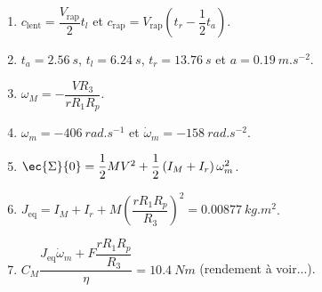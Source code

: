 \else
\ifcolle
\else
\footnotesize
\begin{enumerate}
 \item $c_{\text{lent}}=\dfrac{V_{\text{rap}}}{2}t_l$ et $c_{\text{rap}}=V_{\text{rap}}\left(t_r - \dfrac{1}{2}t_a\right)$.
 \item $t_a=\SI{2,56}{s}$, $t_l=\SI{6,24}{s}$, $t_r=\SI{13,76}{s}$ et $a =\SI{0,19}{m.s^{-2}}$. 
 \item $\omega_M = - \dfrac{VR_3}{rR_1R_p}$.
 \item $\omega_m = -\SI{406}{rad.s^{-1}}$ et  $\dot{\omega}_m= -\SI{158}{rad.s^{-2}}$.
 \item $\ec{\Sigma}{0} = \dfrac{1}{2}MV^2 + \dfrac{1}{2}\left( I_M + I_r \right)\omega_m^2$.
 \item $J_{\text{eq}} = I_M + I_r + M \left( \dfrac{rR_1 R_p}{R_3}\right)^2 = \SI{0,00877}{kg.m^2}$.
 \item $C_M \dfrac{J_{\text{eq}} \dot{\omega}_m + F \dfrac{rR_1R_p}{R_3}}{\eta} = \SI{10,4}{Nm}$ (rendement à voir...).
\end{enumerate}
\fi

\normalsize



\fi